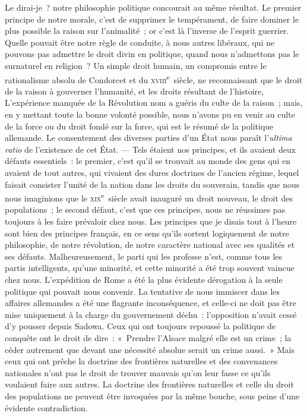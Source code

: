 \documentclass[french,twoside]{book} %
\begin{document}
Le dirai-je ? notre philosophie politique concourait au même résultat. Le premier principe de notre morale, c’est de supprimer le tempérament, de faire dominer le plus possible la raison sur l’animalité ; or c’est là l’inverse de l’esprit guerrier. Quelle pouvait être notre règle de conduite, à nous autres libéraux, qui ne pouvons pas admettre le droit divin en politique, quand nous n’admettons pas le surnaturel en religion ? Un simple droit humain, un compromis entre le rationalisme absolu de Condorcet et du \textsc{xviii}\textsuperscript{e} siècle, ne reconnaissant que le droit de la raison à gouverner l’humanité, et les droits résultant de l’histoire, L’expérience manquée de la Révolution nom a guéris du culte de la raison ; mais, en y mettant toute la bonne volonté possible, nous n’avons pu en venir au culte de la force ou du droit fondé sur la force, qui est le résumé de la politique allemande. Le consentement des diverses parties d’un État nous paraît l’{\itshape ultima ratio} de l’existence de cet État. — Tels étaient nos principes, et ils avaient deux défauts essentiels : le premier, c’est qu’il se trouvait au monde des gens qui en avaient de tout autres, qui vivaient des dures doctrines de l’ancien régime, lequel faisait consister l’unité de la nation dans les droits du souverain, tandis que nous nous imaginions que le \textsc{xix}\textsuperscript{e} siècle avait inauguré un droit nouveau, le droit des populations ; le second défaut, c’est que ces principes, nous ne réussimes pas toujours à les faire prévaloir chez nous. Les principes que je disais tout à l’heure sont bien des principes français, en ce sens qu’ils sortent logiquement de notre philosophie, de notre révolution, de notre caractère national avec ses qualités et ses défauts. Malheureusement, le parti qui les professe n’est, comme tous les partis intelligents, qu’une minorité, et cette minorité a été trop souvent vaincue chez nous. L’expédition de Rome a été la plus évidente dérogation à la seule politique qui pouvait nous convenir. La tentative de nous immiscer dans les affaires allemandes a été une flagrante inconséquence, et celle-ci ne doit pas être mise uniquement à la charge du gouvernement déchu ; l’opposition n’avait cessé d’y pousser depuis Sadowa. Ceux qui ont toujours repoussé la politique de conquête ont le droit de dire : « Prendre l’Alsace malgré elle est un crime ; la céder autrement que devant une nécessité absolue serait un crime aussi. » Mais ceux qui ont prêche la doctrine des frontières naturelles et des convenances nationales n’ont pas le droit de trouver mauvais qu’on leur fasse ce qu’ils voulaient faire aux autres. La doctrine des frontières naturelles et celle du droit des populations ne peuvent être invoquées par la même bouche, sous peine d’une évidente contradiction.\par
\end{document}
